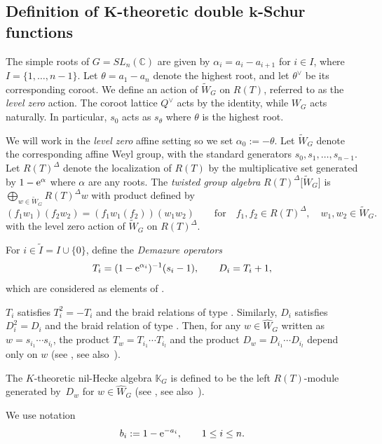 \documentclass[10pt,a4paper]{amsart}
\numberwithin{equation}{section}
\newcommand{\C}{\mathbb{C}}
\newcommand{\reg}{\Delta}
\newcommand{\Rep}{{R(T)}}
\theoremstyle{definition}
\begin{document}
\subsection[Definition of K-theoretic double k-Schur functions]{Definition of $\boldsymbol{K}$-theoretic double $\boldsymbol{k}$-Schur functions}
\label{sec:def_K-k}
The simple roots of $G=SL_n(\C)$ are given by
$\alpha_i=a_i-a_{i+1}$ for $i\in I$, where
$I=\{1,\dots,n-1\}$.
Let $\theta=a_1-a_n$ denote the highest root, and let $\theta^\vee$ be its corresponding coroot.
We define an action of $\tilde{W}_G$ on $R(T)$, referred to as the \emph{level zero} action. The coroot lattice $Q^\lor$ acts by the identity, while
$W_G$ acts naturally. In particular, $s_0$ acts as $s_\theta$ where $\theta$ is the highest root.

We will work in the \emph{level zero} affine setting so we set $\alpha_0:=-\theta$.
Let $\tilde{W}_G$ denote the corresponding affine Weyl group, with the standard generators $s_0,s_1,\dots,s_{n-1}$.
Let $\Rep^\reg$ denote the localization of $\Rep$ by
the multiplicative set generated by $1-{\rm e}^{\alpha}$ where
$\alpha$ are any roots.
The \emph{twisted group algebra} $\Rep^\reg\big[\tilde{W}_G\big]$
is $\bigoplus_{w\in\tilde{W}_G }\Rep^\reg w$ with product defined by
\[
(f_1w_1)(f_2w_2)=(f_1w_1(f_2))(w_1w_2)
\qquad \text{for}\quad f_1,f_2\in\Rep^\reg,\quad w_1,w_2\in \tilde{W}_G.
\]
with the level zero action of
$\tilde{W}_G$ on $\Rep^\reg$.


For $i\in \tilde{I}=I\cup\{0\}$, define the \emph{ Demazure operators}
\begin{equation}
\label{eq:def_Demazure}
T_i=(1-{\rm e}^{\alpha_i})^{-1}(s_i-1),\qquad
D_i=T_i+1,
\end{equation}
which are considered as
elements of \smash{$\Rep^\reg\big[\tilde{W}_G\big]$}.


$T_i$ satisfies $T_i^2 = -T_i$ and the braid relations of type . Similarly, $D_i$ satisfies $D_i^2 = D_i$ and the braid relation of type . Then, for any $ w \in \hat{W}_G$ written as $w = s_{i_1} \cdots s_{i_l}$, the product
$
T_w = T_{i_1} \cdots T_{i_l}
$ and the product
$
D_w = D_{i_1} \cdots D_{i_l}
$ depend only on $w$ (see \cite{LSS:K}, see also~\cite{ISY}).

The $K$-theoretic nil-Hecke algebra $\mathbb{K}_G$ is defined to be the left $\Rep$-module
generated by~$D_w$ for $w\in \hat{W}_G$
(see \cite{LSS:K}, see also~\cite{ISY}).

We use notation
\begin{equation}
\label{eq:b_i}
b_i:=1-{\rm e}^{-a_i},\qquad 1\le i\le n.
\end{equation}
\end{document}

